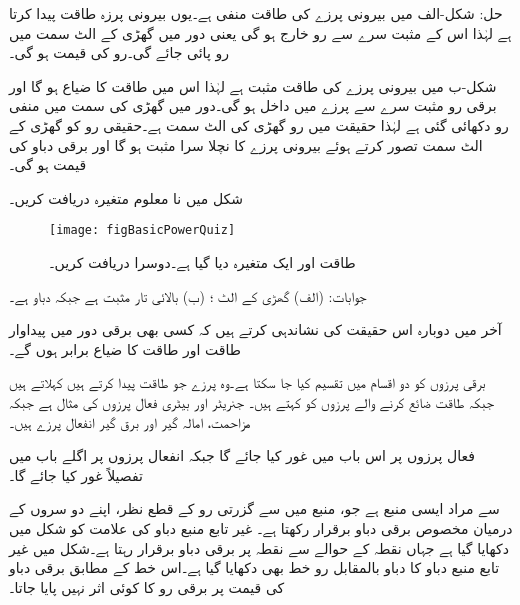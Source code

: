 حل: شکل-الف میں بیرونی پرزے کی طاقت منفی ہے۔یوں بیرونی پرزہ طاقت پیدا کرتا ہے لہٰذا اس کے مثبت سرے سے رو خارج ہو گی یعنی دور میں گھڑی کے الٹ سمت میں رو پائی جائے گی۔رو کی قیمت  ہو گی۔

شکل-ب میں بیرونی پرزے کی طاقت مثبت ہے لہٰذا اس میں طاقت کا ضیاع ہو گا اور برقی رو مثبت سرے سے پرزے میں داخل ہو گی۔دور میں گھڑی کی سمت میں منفی رو دکھائی گئی ہے لہٰذا حقیقت میں رو گھڑی کی الٹ سمت ہے۔حقیقی رو کو گھڑی کے الٹ سمت تصور کرتے ہوئے  بیرونی پرزے کا نچلا سرا مثبت ہو گا اور برقی دباو کی قیمت  ہو گی۔

شکل  میں نا معلوم متغیرہ دریافت کریں۔ 
\begin{figure}
\centering
\texttt{[image: figBasicPowerQuiz]}
\caption{طاقت اور ایک متغیرہ دیا گیا ہے۔دوسرا دریافت کریں۔}
\label{شکل_بنیادی_طاقت_مشق}
\end{figure}

جوابات: (الف) گھڑی کے الٹ ؛ (ب) بالائی تار مثبت ہے جبکہ دباو  ہے۔  

آخر میں دوبارہ اس حقیقت کی نشاندہی کرتے ہیں کہ کسی بھی برقی دور میں پیداوار طاقت اور طاقت کا ضیاع برابر ہوں گے۔

برقی پرزوں کو دو اقسام میں تقسیم کیا جا سکتا ہے۔وہ پرزے جو طاقت پیدا کرتے ہیں  کہلاتے ہیں جبکہ طاقت ضائع کرنے والے پرزوں کو  کہتے ہیں۔ جنریٹر اور بیٹری فعال پرزوں کی مثال ہے جبکہ مزاحمت، امالہ گیر اور برق گیر انفعال پرزے ہیں۔

فعال پرزوں پر اس باب میں غور کیا جائے گا جبکہ انفعال پرزوں پر اگلے باب میں تفصیلاً غور کیا جائے گا۔ 

 سے مراد ایسی منبع ہے جو، منبع میں سے گزرتی رو کے قطع نظر، اپنے دو سروں کے درمیان مخصوص برقی دباو برقرار رکھتا ہے۔ غیر تابع منبع دباو کی علامت کو شکل  میں دکھایا گیا ہے جہاں نقطہ  کے حوالے سے نقطہ  پر  برقی دباو برقرار رہتا ہے۔شکل میں غیر تابع منبع دباو کا دباو بالمقابل رو   خط بھی دکھایا گیا ہے۔اس خط کے مطابق برقی دباو کی قیمت پر برقی رو کا کوئی اثر نہیں پایا جاتا۔

